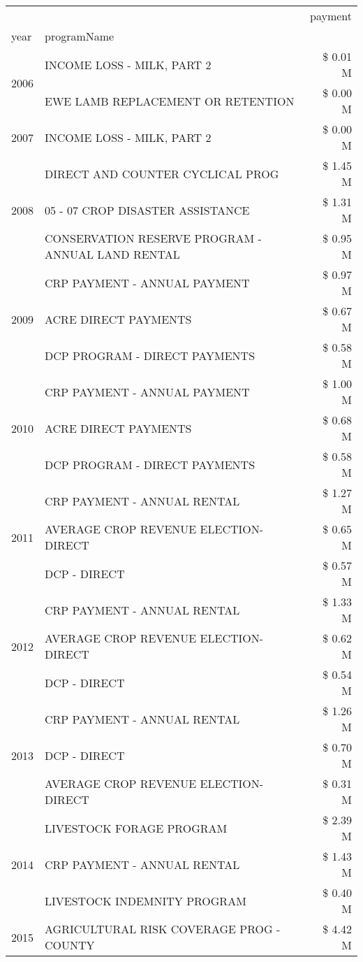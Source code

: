 \begin{tabular}{llr}
\toprule
 &  & payment \\
year & programName &  \\
\midrule
\multirow[t]{2}{*}{2006} & INCOME LOSS - MILK, PART 2 & \$ 0.01 M \\
 & EWE LAMB REPLACEMENT OR RETENTION & \$ 0.00 M \\
\cline{1-3}
2007 & INCOME LOSS - MILK, PART 2 & \$ 0.00 M \\
\cline{1-3}
\multirow[t]{3}{*}{2008} & DIRECT AND COUNTER CYCLICAL PROG & \$ 1.45 M \\
 & 05 - 07 CROP DISASTER ASSISTANCE & \$ 1.31 M \\
 & CONSERVATION RESERVE PROGRAM - ANNUAL LAND RENTAL & \$ 0.95 M \\
\cline{1-3}
\multirow[t]{3}{*}{2009} & CRP PAYMENT - ANNUAL PAYMENT & \$ 0.97 M \\
 & ACRE DIRECT PAYMENTS & \$ 0.67 M \\
 & DCP PROGRAM - DIRECT PAYMENTS & \$ 0.58 M \\
\cline{1-3}
\multirow[t]{3}{*}{2010} & CRP PAYMENT - ANNUAL PAYMENT & \$ 1.00 M \\
 & ACRE DIRECT PAYMENTS & \$ 0.68 M \\
 & DCP PROGRAM - DIRECT PAYMENTS & \$ 0.58 M \\
\cline{1-3}
\multirow[t]{3}{*}{2011} & CRP PAYMENT - ANNUAL RENTAL & \$ 1.27 M \\
 & AVERAGE CROP REVENUE ELECTION-DIRECT & \$ 0.65 M \\
 & DCP - DIRECT & \$ 0.57 M \\
\cline{1-3}
\multirow[t]{3}{*}{2012} & CRP PAYMENT - ANNUAL RENTAL & \$ 1.33 M \\
 & AVERAGE CROP REVENUE ELECTION-DIRECT & \$ 0.62 M \\
 & DCP - DIRECT & \$ 0.54 M \\
\cline{1-3}
\multirow[t]{3}{*}{2013} & CRP PAYMENT - ANNUAL RENTAL & \$ 1.26 M \\
 & DCP - DIRECT & \$ 0.70 M \\
 & AVERAGE CROP REVENUE ELECTION-DIRECT & \$ 0.31 M \\
\cline{1-3}
\multirow[t]{3}{*}{2014} & LIVESTOCK FORAGE PROGRAM & \$ 2.39 M \\
 & CRP PAYMENT - ANNUAL RENTAL & \$ 1.43 M \\
 & LIVESTOCK INDEMNITY PROGRAM & \$ 0.40 M \\
\cline{1-3}
\multirow[t]{3}{*}{2015} & AGRICULTURAL RISK COVERAGE PROG - COUNTY & \$ 4.42 M \\

\end{tabular}
